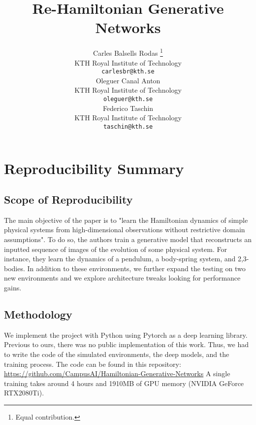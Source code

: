 \documentclass{article}
\title{Re-Hamiltonian Generative Networks}
\author{%
  Carles Balsells Rodas \thanks{Equal contribution.}\\
  KTH Royal Institute of Technology\\
  \texttt{carlesbr@kth.se}\\
   \And
   Oleguer Canal Anton \printfnsymbol{1}\\
   KTH Royal Institute of Technology \\
   \texttt{oleguer@kth.se} \\
   \And
   Federico Taschin \printfnsymbol{1}\\
   KTH Royal Institute of Technology \\
   \texttt{taschin@kth.se} \\
}
\begin{document}
\maketitle

\section*{\centering Reproducibility Summary}


\subsection*{Scope of Reproducibility}

The main objective of the paper is to "learn the Hamiltonian dynamics of simple physical systems from high-dimensional observations without restrictive domain assumptions".
To do so, the authors train a generative model that reconstructs an inputted sequence of images of the evolution of some physical system.
For instance, they learn the dynamics of a pendulum, a body-spring system, and 2,3-bodies.
In addition to these environments, we further expand the testing on two new environments and we explore architecture tweaks looking for performance gains.

\subsection*{Methodology}

We implement the project with Python using Pytorch \cite{pytorch} as a deep learning library.
Previous to ours, there was no public implementation of this work.
Thus, we had to write the code of the simulated environments, the deep models, and the training process.
The code can be found in this repository: \href{https://github.com/CampusAI/Hamiltonian-Generative-Networks}{https://github.com/CampusAI/Hamiltonian-Generative-Networks}
A single training takes around 4 hours and 1910MB of GPU memory (NVIDIA GeForce RTX2080Ti).
\end{document}
